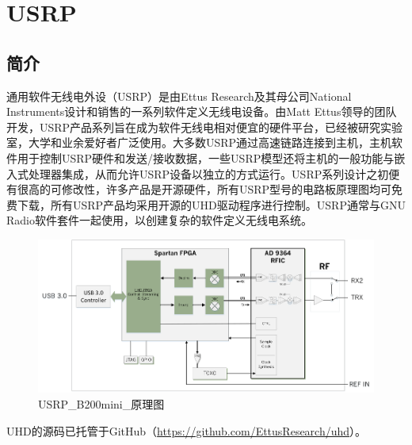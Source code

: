 	\section{USRP}
		\subsection{简介}
			\par 通用软件无线电外设（USRP）是由Ettus Research及其母公司National Instruments设计和销售的一系列软件定义无线电设备。由Matt Ettus领导的团队开发，USRP产品系列旨在成为软件无线电相对便宜的硬件平台，已经被研究实验室，大学和业余爱好者广泛使用。大多数USRP通过高速链路连接到主机，主机软件用于控制USRP硬件和发送/接收数据，一些USRP模型还将主机的一般功能与嵌入式处理器集成，从而允许USRP设备以独立的方式运行。USRP系列设计之初便有很高的可修改性，许多产品是开源硬件，所有USRP型号的电路板原理图均可免费下载，所有USRP产品均采用开源的UHD驱动程序进行控制。USRP通常与GNU Radio软件套件一起使用，以创建复杂的软件定义无线电系统。
			\begin{figure}[htbp]
				\centering
				\includegraphics[width=13cm]{figures/USRP_B200mini_BD.png}
				\caption{USRP\_B200mini\_原理图}
				\label{fig:USRP_B200mini_原理图}
			\end{figure}
			\par UHD的源码已托管于GitHub（\href{https://github.com/EttusResearch/uhd}{https://github.com/EttusResearch/uhd}）。
